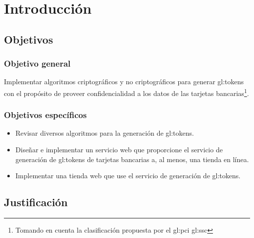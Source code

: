 %
%

\chapter{Introducción}







\section{Objetivos}

\subsection{Objetivo general}

Implementar algoritmos criptográficos y no criptográficos para generar
\glspl{gl:token} con el propósito de proveer confidencialidad a los datos de las
tarjetas bancarias\footnote{Tomando en cuenta la clasificación propuesta por el
\gls{gl:pci} \gls{gl:ssc}}.

\subsection{Objetivos específicos}

\begin{itemize}
  \item Revisar diversos algoritmos para la generación de \glspl{gl:token}.
  \item Diseñar e implementar un servicio web que proporcione el servicio de
    generación de \glspl{gl:token} de tarjetas bancarias a, al menos, una tienda
    en línea.
  \item Implementar una tienda web que use el servicio de generación de
    \glspl{gl:token}.
\end{itemize}

\section{Justificación}


